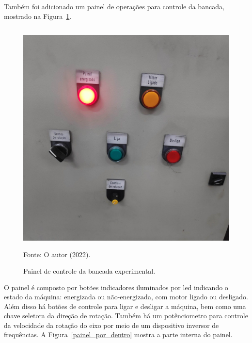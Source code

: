 \documentclass[
	12pt,				
	oneside,			
	a4paper,			
	english,			
	brazil,			
	]{abntex2ppgsi}
\begin{document}
Também foi adicionado um painel de operações para controle da bancada, mostrado na Figura~\ref{painel_bancada}. 

\begin{figure}[H]
\centering
\caption {Painel de controle da bancada experimental.}
\includegraphics[width=\textwidth,height=120mm,keepaspectratio]{painel_bancada} \\
Fonte: O autor (2022).
\label{painel_bancada}
\end{figure}
 
O painel é composto por botões indicadores iluminados por led indicando o estado da máquina: energizada ou não-energizada, com motor ligado ou desligado. Além disso há botões de controle para ligar e desligar a máquina, bem como uma chave seletora da direção de rotação. Também há um potênciometro para controle da velocidade da rotação do eixo por meio de um dispositivo inversor de frequências. A Figura~\ref{painel_por_dentro} mostra a parte interna do painel.
 
\end{document}

